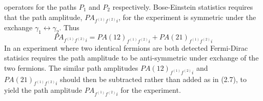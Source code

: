 \documentclass [12pt]{article}
\begin{document}
{   operators for the paths  $P_1$ and $P_2$ respectively. Bose-Einstein statistics requires that the 
   path amplitude, $PA_{f^{(1)}f^{(2)}i}$, for the experiment is symmetric under
   the exchange $\gamma_1 \leftrightarrow \gamma_2$.
   Thus 
  \begin{equation}
    PA_{f^{(1)}f^{(2)}i} =  PA(12)_{f^{(1)}f^{(2)}i} +  PA(21)_{f^{(1)}f^{(2)}i}
   \end{equation}
   In an experiment where two identical fermions are both detected Fermi-Dirac statisics
    requires the path amplitude to be anti-symmetric under exchange of the two fermions. The similar
    path amplitudes  $PA(12)_{f^{(1)}f^{(2)}i}$ and  $PA(21)_{f^{(1)}f^{(2)}i}$ should then be subtracted rather than
   added as in (2.7), to yield the path amplitude $PA_{f^{(1)}f^{(2)}i}$ for the experiment.
 
}
\end{document}
